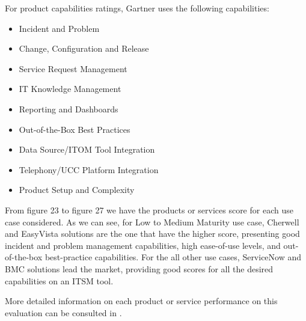 For product capabilities ratings, Gartner uses the following capabilities:

\begin{itemize}
\item Incident and Problem
\item Change, Configuration and Release
\item Service Request Management
\item IT Knowledge Management
\item Reporting and Dashboards
\item Out-of-the-Box Best Practices
\item Data Source/ITOM Tool Integration
\item Telephony/UCC Platform Integration
\item Product Setup and Complexity
\end{itemize}

From figure 23 to figure 27 we have the products or services score for each use case considered. As we can see, for Low to Medium Maturity use case, Cherwell and EasyVista solutions are the one that have the higher score, presenting good incident and problem management capabilities, high ease-of-use levels, and out-of-the-box best-practice capabilities. For the all other use cases, ServiceNow and BMC solutions lead the market, providing good scores for all the desired capabilities on an ITSM tool.\par
More detailed information on each product or service performance on this evaluation can be consulted in \cite{GartnerCriticalCapabilities}.



